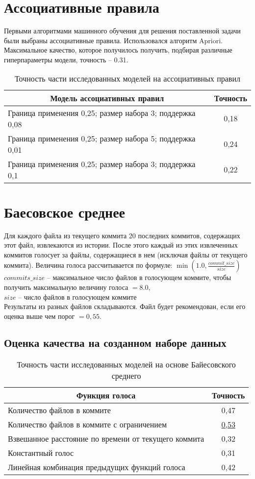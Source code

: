 \section{Ассоциативные правила}
Первыми алгоритмами машинного обучения для решения поставленной задачи были выбраны ассоциативные правила. Использовался алгоритм Apriori. Максимальное качество, которое получилось получить, подбирая различные гиперпараметры модели, точность -- 0.31. 
\begin{table}[!h]
\caption{Точность части исследованных моделей на ассоциативных правил}\label{ar-offline-result-table}
\centering
\begin{tabular}{|l|c|}\hline
\multicolumn{1}{|c|}{\textbf{Модель ассоциативных правил}} & \textbf{Точность}\\\hline
Граница применения 0,25; размер набора 3; поддержка 0,08 & 0,18\\\hline
Граница применения 0,25; размер набора 5; поддержка 0,01  & 0,24 \\\hline
Граница применения 0,25; размер набора 3; поддержка 0,1  & 0,22\\\hline
\end{tabular}
\end{table}
\section{Баесовское среднее}
Для каждого файла из текущего коммита 20 последних коммитов, содержащих этот файл, извлекаются из истории. После этого каждый из этих извлеченных коммитов голосует за файлы, содержащиеся в нем (исключая файлы от текущего коммита). Величина голоса рассчитывается по формуле: $\min(1.0, \frac{{commit\_size}}{{size}})$\\
$commits\_size$ --  максимальное число файлов в голосующем коммите, чтобы получить максимальную величину голоса $= 8.0$,\\
$size$ -- число файлов в голосующем коммите\\
Результаты из разных файлов складываются. Файл будет рекомендован, если его оценка выше чем порог $= 0,55$.
\subsection{Оценка качества на созданном наборе данных}
\begin{table}[!h]
\caption{Точность части исследованных моделей на основе Байесовского среднего}\label{bayes-offline-result-table}
\centering
\begin{tabular}{|l|c|}\hline
\multicolumn{1}{|c|}{\textbf{Функция голоса}} & \textbf{Точность}\\\hline
Количество файлов в коммите & 0,47\\\hline
Количество файлов в коммите с ограничением  & \uline{0,53} \\\hline
Взвешанное расстояние по времени от текущего коммита  & 0,32\\\hline
Константный голос  & 0,31\\\hline
Линейная комбинация предыдущих функций голоса  & 0,42\\\hline
\end{tabular}
\end{table}
